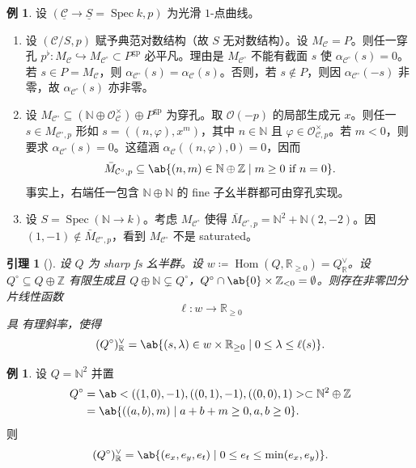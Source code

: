 \documentclass{amsart}
\newtheorem{lem}[thm]{引理}
\theoremstyle{definition}
\newtheorem{exm}[thm]{例}
\theoremstyle{remark}
\theoremstyle{plain}
\theoremstyle{definition}
\theoremstyle{remark}
\newcommand{\N}{\mathbb{N}}
\newcommand{\R}{\mathbb{R}}
\newcommand{\Z}{\mathbb{Z}}
\newcommand{\mc}[1]{\mathcal{#1}}
\newcommand{\on}[1]{\operatorname{#1}}
\newcommand{\ul}[1]{\underline{#1}}
\newcommand{\1}{\mathbf{1}}
\newcommand{\2}{\mathbf{2}}
\newcommand{\3}{\mathbf{3}}
\DeclareMathOperator{\Hom}{Hom}
\DeclareMathOperator{\Spec}{Spec}
\begin{document}
\begin{exm}
    设 \((\ul{\mc{C}} \to \ul{S} = \Spec k, p)\) 为光滑 \(1\)-点曲线。
    \begin{enumerate}
        \item 设 \((\mc{C}/S, p)\) 赋予典范对数结构（故 \(S\) 无对数结构）。设 \(M_{\mc{C}} = P\)。则任一穿孔 \(p^{\flat} \colon M_{\mc{C}} \hookrightarrow M_{\mc{C}^{\circ}} \subset P^{\on{gp}}\) 必平凡。理由是 \(M_{\mc{C}^{\circ}}\) 不能有截面 \(s\) 使 \(\alpha_{\mc{C}^{\circ}}(s) = 0\)。若 \(s \in P = M_{\mc{C}}\)，则 \(\alpha_{\mc{C}^{\circ}}(s) = \alpha_{\mc{C}}(s)\)。否则，若 \(s \notin P\)，则因 \(\alpha_{\mc{C}^{\circ}}(-s)\) 非零，故 \(\alpha_{\mc{C}^{\circ}}(s)\) 亦非零。
        \item 设 \(M_{\mc{C}^{\circ}} \subseteq (\N \oplus \mc{O}_{\mc{C}}^{\times}) \oplus P^{\on{gp}}\) 为穿孔。取 \(\mc{O}(-p)\) 的局部生成元 \(x\)。则任一 \(s \in M_{\mc{C}^{\circ}, p}\) 形如 \(s = ((n, \varphi), x^m)\)，其中 \(n \in \N\) 且 \(\varphi \in \mc{O}_{\mc{C}, p}^{\times}\)。若 \(m < 0\)，则要求 \(\alpha_{\mc{C}^{\circ}}(s) = 0\)。这蕴涵 \(\alpha_{\mc{C}}((n, \varphi), 0) = 0\)，因而
            \[ \bar{M}_{\mc{C}^{\circ}, p} \subseteq \ab\{(n, m) \in \N \oplus \Z \mid m \geq 0 \text{ if } n = 0 \}. \]
            事实上，右端任一包含 \(\N \oplus \N\) 的 fine 子幺半群都可由穿孔实现。
        \item 设 \(S = \Spec(\N \to k)\)。考虑 \(M_{\mc{C}^{\circ}}\) 使得 \(\bar{M}_{\mc{C}^{\circ}, p} = \N^2 + \N (2,-2)\)。因 \((1,-1) \notin \bar{M}_{\mc{C}^{\circ}, p}\)，看到 \(M_{\mc{C}^{\circ}}\) 不是 saturated。
    \end{enumerate}
\end{exm}

\begin{lem}[{\cite{ACGS2025}}]
    设 \(Q\) 为 sharp fs 幺半群。设 \(w \coloneqq \Hom(Q, \R_{\geq 0}) = Q_{\R}^{\vee}\)。设 \(Q^{\circ} \subseteq Q \oplus \Z\) 有限生成且 \(Q \oplus \N \subsetneq Q^{\circ}\)，\(Q^{\circ} \cap \ab\{0\} \times \Z_{<0} = \emptyset\)。则存在非零凹分片线性函数
    \[ \ell \colon w \to \R_{\geq 0} \]
    具 有理斜率，使得
    \[ (Q^{\circ})_{\R}^{\vee} = \ab\{ (s, \lambda) \in w \times \R_{\geq 0} \mid 0 \leq \lambda \leq \ell(s) \}. \]
\end{lem}

\begin{exm}
    设 \(Q = \N^2\) 并置
    \begin{align*}
        Q^{\circ} &= \ab<((1,0), -1), ((0,1), -1), ((0,0),1)> \subset \N^2 \oplus \Z \\
        &= \ab\{((a,b), m) \mid a+b+m \geq 0, a,b \geq 0 \}.
    \end{align*}
    则
    \[ (Q^{\circ})_{\R}^{\vee} = \ab\{ (e_x, e_y, e_t) \mid 0 \leq e_t \leq \min(e_x, e_y) \}. \]
\end{exm}
\end{document}

